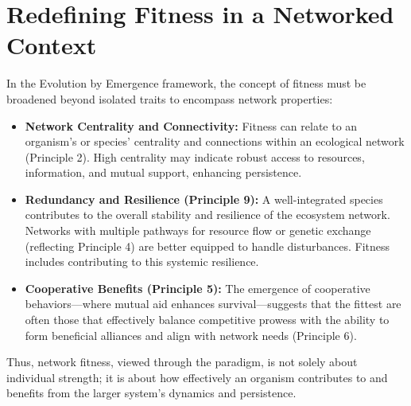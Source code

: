 \section{Redefining Fitness in a Networked Context}
In the Evolution by Emergence framework, the concept of fitness must be broadened beyond isolated traits to encompass network properties:
\begin{itemize}
    \item \textbf{Network Centrality and Connectivity:} Fitness can relate to an organism’s or species’ centrality and connections within an ecological network (Principle 2). High centrality may indicate robust access to resources, information, and mutual support, enhancing persistence.
    \item \textbf{Redundancy and Resilience (Principle 9):} A well-integrated species contributes to the overall stability and resilience of the ecosystem network. Networks with multiple pathways for resource flow or genetic exchange (reflecting Principle 4) are better equipped to handle disturbances. Fitness includes contributing to this systemic resilience.
    \item \textbf{Cooperative Benefits (Principle 5):} The emergence of cooperative behaviors—where mutual aid enhances survival—suggests that the fittest are often those that effectively balance competitive prowess with the ability to form beneficial alliances and align with network needs (Principle 6).
\end{itemize}
Thus, network fitness, viewed through the paradigm, is not solely about individual strength; it is about how effectively an organism contributes to and benefits from the larger system's dynamics and persistence. %

